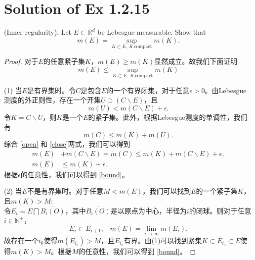 \documentclass[reqno,a4paper,14pt]{amsart}
\begin{document}
\section{Solution of Ex 1.2.15}
(Inner regularity). Let $E\subset \mathbb{R}^d$ be Lebesgue measurable. Show that 
\begin{equation*}
    m(E)=\sup_{K\subset E,\ K\ \mathrm{compact}} m(K).
\end{equation*}
\begin{proof}
    对于$E$的任意紧子集$K$，$m(E)\geq m(K)$显然成立。故我们下面证明
    \begin{equation}
        m(E)\leq\sup_{K\subset E,\ K\ \mathrm{compact}} m(K)
        \label{bound}
    \end{equation}

    (1) 当$E$是有界集时。令$C$是包含$E$的一个有界闭集，对于任意$\epsilon>0$。由Lebesgue测度的外正则性，存在一个开集$U\supset (C\backslash E)$，且
    \begin{equation}
        m(U)<m(C\backslash E) +\epsilon.
        \label{open}
    \end{equation}
    令$K=C\backslash U$，则$K$是一个$E$的紧子集。此外，根据Lebesgue测度的单调性，我们有
    \begin{equation}
        m(C)\leq m(K)+m(U).
        \label{close}
    \end{equation}
    综合 \eqref{open} 和 \eqref{close}两式，我们可以得到
    \begin{equation*}
        \begin{split}
            m(E)&+m(C\backslash E)=m(C)\leq m(K)+m(C\backslash E) +\epsilon,\\
            m(E)&\leq m(K)+\epsilon.
        \end{split}
    \end{equation*}
    根据$\epsilon$的任意性，我们可以得到 \eqref{bound}。

    (2) 当$E$不是有界集时。对于任意$M<m(E)$，我们可以找到$E$的一个紧子集$K$，且$m(K)>M$:\\令$E_i=E\bigcap \overline{B_i(O)}$，其中$\overline{B_i(O)}$是以原点为中心，半径为$i$的闭球。则对于任意$i\in\mathbb{N}^+$，
    \begin{equation*}
        E_i\subset E_{i+1},\;\;\; m(E)=\lim_{i\to\infty} m(E_i).
    \end{equation*}
    故存在一个$i_0$使得$m(E_{i_0})>M$，且$E_{i_0}$有界。由(1)可以找到紧集$K\subset E_{i_0}\subset E$使得$m(K)>M$。根据$M$的任意性，我们可以得到 \eqref{bound}。

\end{proof}
\end{document}
